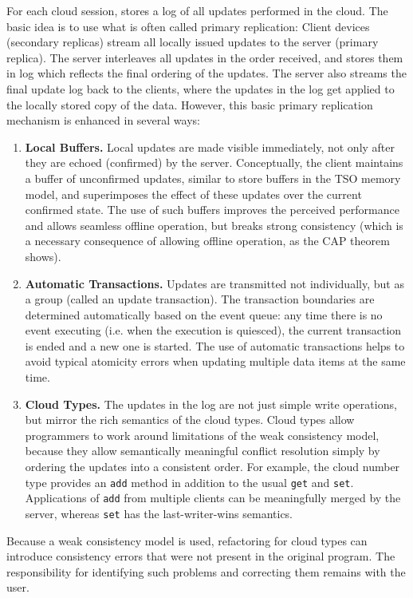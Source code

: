 \documentclass[article]{sigplanconf}
\begin{document}
For each cloud session, \TD stores a log of all updates performed in the cloud. The basic idea is to use what is often called primary replication: Client devices (secondary replicas) stream all locally issued updates to the \TD server (primary replica). The server interleaves all updates in the order received, and stores them in log which reflects the final ordering of the updates. The server also streams the final update log back to the clients, where the updates in the log get applied to the locally stored copy of the data. However, this basic primary replication mechanism is enhanced in several ways:
\begin{enumerate}
\item \textbf{Local Buffers.}  Local updates are made visible immediately, not only after they are echoed (confirmed) by the server. Conceptually, the client maintains a buffer of unconfirmed updates, similar to store buffers in the TSO memory model, and superimposes the effect of these updates over the current confirmed state. The use of such buffers improves the perceived performance and allows seamless offline operation, but breaks strong consistency (which is a necessary consequence of allowing offline operation, as the CAP theorem \cite{cap-brewer,gilbert-lynch-SIGACT02} shows).
\item \textbf{Automatic Transactions.} Updates are transmitted not individually, but as a group (called an update transaction). The transaction boundaries are determined automatically based on the event queue: any time there is no event executing (i.e. when the execution is quiesced), the current transaction is ended and a new one is started. The use of automatic transactions helps to avoid typical atomicity errors when updating multiple data items at the same time.
\item \textbf{Cloud Types.} The updates in the log are not just simple write operations, but mirror the rich semantics of the cloud types. Cloud types allow programmers to work around limitations of the weak consistency model, because they allow semantically meaningful conflict resolution simply by ordering the updates into a consistent order.
For example, the cloud number type provides an \texttt{add} method in addition to the usual \texttt{get} and \texttt{set}.
Applications of \texttt{add} from multiple clients can be meaningfully merged by the server, whereas \texttt{set} has the last-writer-wins
semantics.
\end{enumerate}

Because a weak consistency model is used, refactoring for cloud types can introduce consistency errors that were not present in the original program. The responsibility for identifying such problems and correcting them remains with the user.
\end{document}

